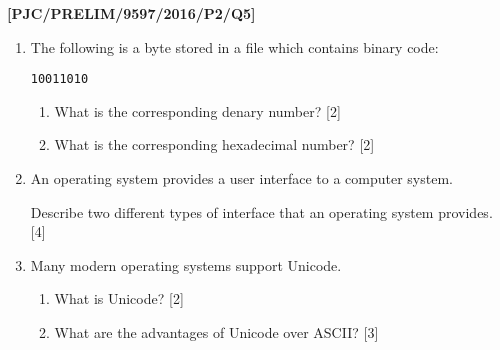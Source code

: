 \item \textbf{{[}PJC/PRELIM/9597/2016/P2/Q5{]} }
\begin{enumerate}
\item The following is a byte stored in a file which contains binary code: 
\noindent \begin{center}
\texttt{10011010 }
\par\end{center}
\begin{enumerate}
\item What is the corresponding denary number? \hfill{} {[}2{]}
\item What is the corresponding hexadecimal number? \hfill{}{[}2{]}
\end{enumerate}
\item An operating system provides a user interface to a computer system. 

Describe two different types of interface that an operating system
provides. \hfill{} {[}4{]}
\item Many modern operating systems support Unicode.
\begin{enumerate}
\item What is Unicode? \hfill{} {[}2{]}
\item What are the advantages of Unicode over ASCII? \hfill{}{[}3{]}
\end{enumerate}
\end{enumerate}